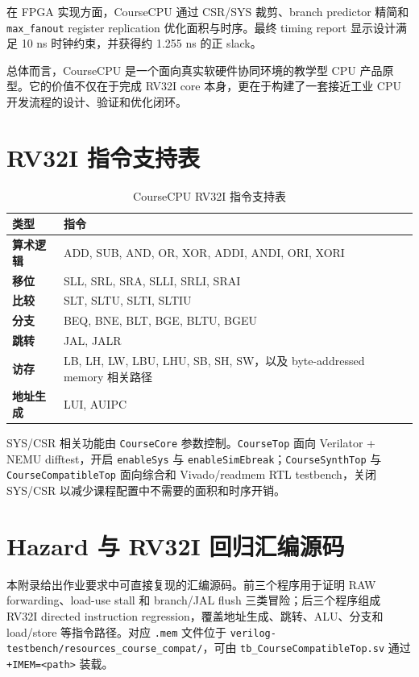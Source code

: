 \documentclass[UTF8,a4paper,12pt]{ctexrep}
\begin{document}
在 FPGA 实现方面，CourseCPU 通过 CSR/SYS 裁剪、branch predictor 精简和 \texttt{max\_fanout} register replication 优化面积与时序。最终 timing report 显示设计满足 10 ns 时钟约束，并获得约 1.255 ns 的正 slack。

总体而言，CourseCPU 是一个面向真实软硬件协同环境的教学型 CPU 产品原型。它的价值不仅在于完成 RV32I core 本身，更在于构建了一套接近工业 CPU 开发流程的设计、验证和优化闭环。

\appendix

\chapter{RV32I 指令支持表}
\label{app:rv32i-support}

\begin{longtable}{>{\bfseries}l p{}}
  \caption{CourseCPU RV32I 指令支持表}\\
  \toprule
  类型 & 指令 \\
  \midrule
  算术逻辑 & ADD, SUB, AND, OR, XOR, ADDI, ANDI, ORI, XORI \\
  移位 & SLL, SRL, SRA, SLLI, SRLI, SRAI \\
  比较 & SLT, SLTU, SLTI, SLTIU \\
  分支 & BEQ, BNE, BLT, BGE, BLTU, BGEU \\
  跳转 & JAL, JALR \\
  访存 & LB, LH, LW, LBU, LHU, SB, SH, SW，以及 byte-addressed memory 相关路径 \\
  地址生成 & LUI, AUIPC \\
  \bottomrule
\end{longtable}

SYS/CSR 相关功能由 \texttt{CourseCore} 参数控制。\texttt{CourseTop} 面向 Verilator + NEMU difftest，开启 \texttt{enableSys} 与 \texttt{enableSimEbreak}；\texttt{CourseSynthTop} 与 \texttt{CourseCompatibleTop} 面向综合和 Vivado/readmem RTL testbench，关闭 SYS/CSR 以减少课程配置中不需要的面积和时序开销。

\chapter{Hazard 与 RV32I 回归汇编源码}
\label{app:rv32i-regression-asm}

本附录给出作业要求中可直接复现的汇编源码。前三个程序用于证明 RAW forwarding、load-use stall 和 branch/JAL flush 三类冒险；后三个程序组成 RV32I directed instruction regression，覆盖地址生成、跳转、ALU、分支和 load/store 等指令路径。对应 \texttt{.mem} 文件位于 \texttt{verilog-testbench/resources\_course\_compat/}，可由 \texttt{tb\_CourseCompatibleTop.sv} 通过 \texttt{+IMEM=<path>} 装载。
\end{document}
